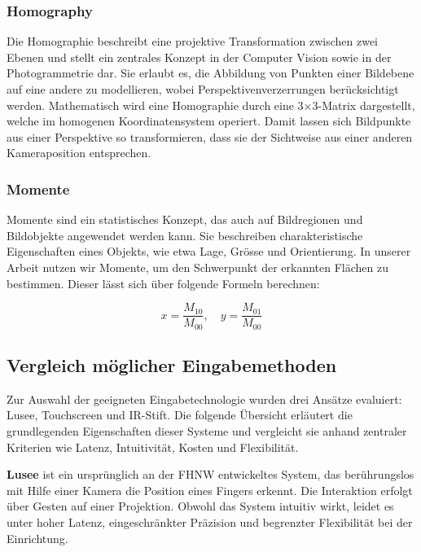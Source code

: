 \subsubsection{Homography}

Die Homographie beschreibt eine projektive Transformation zwischen zwei Ebenen und stellt ein zentrales Konzept in der Computer Vision sowie in der Photogrammetrie dar. Sie erlaubt es, die Abbildung von Punkten einer Bildebene auf eine andere zu modellieren, wobei Perspektivenverzerrungen berücksichtigt werden. Mathematisch wird eine Homographie durch eine 3×3-Matrix dargestellt, welche im homogenen Koordinatensystem operiert. Damit lassen sich Bildpunkte aus einer Perspektive so transformieren, dass sie der Sichtweise aus einer anderen Kameraposition entsprechen.
\\
\cite{cv_hartley_zisserman}

\clearpage

\subsubsection{Momente}

Momente sind ein statistisches Konzept, das auch auf Bildregionen und Bildobjekte angewendet werden kann. Sie beschreiben charakteristische Eigenschaften eines Objekts, wie etwa Lage, Grösse und Orientierung. In unserer Arbeit nutzen wir Momente, um den Schwerpunkt der erkannten Flächen zu bestimmen. Dieser lässt sich über folgende Formeln berechnen:

\[
x = \frac{M_{10}}{M_{00}}, \quad y = \frac{M_{01}}{M_{00}}
\]

\cite{momente}


\subsection{Vergleich möglicher Eingabemethoden}

Zur Auswahl der geeigneten Eingabetechnologie wurden drei Ansätze evaluiert: Lusee, Touchscreen und IR-Stift. Die folgende Übersicht erläutert die grundlegenden Eigenschaften dieser Systeme und vergleicht sie anhand zentraler Kriterien wie Latenz, Intuitivität, Kosten und Flexibilität.

\textbf{Lusee} ist ein ursprünglich an der FHNW entwickeltes System, das berührungslos mit Hilfe einer Kamera die Position eines Fingers erkennt. Die Interaktion erfolgt über Gesten auf einer Projektion. Obwohl das System intuitiv wirkt, leidet es unter hoher Latenz, eingeschränkter Präzision und begrenzter Flexibilität bei der Einrichtung.\\
\cite{lusee_hardware}

